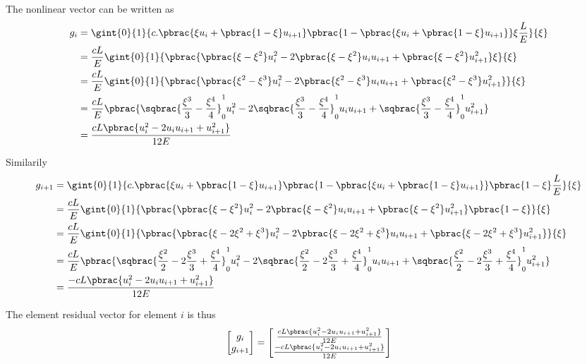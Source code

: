 The nonlinear vector can be written as
\begin{align}
  g_{i}&=\gint{0}{1}{c.\pbrac{\xi u_{i}+\pbrac{1-\xi}u_{i+1}}\pbrac{1-\pbrac{\xi u_{i}+\pbrac{1-\xi}u_{i+1}}}\xi\dfrac{L}{E}}{\xi} \\
  &=\dfrac{cL}{E}\gint{0}{1}{\pbrac{\pbrac{\xi-\xi^{2}}u^{2}_{i}-2\pbrac{\xi-\xi^{2}}u_{i}u_{i+1}+\pbrac{\xi-\xi^{2}}u^{2}_{i+1}}\xi}{\xi} \\
  &=\dfrac{cL}{E}\gint{0}{1}{\pbrac{\pbrac{\xi^{2}-\xi^{3}}u^{2}_{i}-2\pbrac{\xi^{2}-\xi^{3}}u_{i}u_{i+1}+\pbrac{\xi^{2}-\xi^{3}}u^{2}_{i+1}}}{\xi} \\
  &=\dfrac{cL}{E}\pbrac{\sqbrac{\dfrac{\xi^{3}}{3}-\dfrac{\xi^{4}}{4}}^{1}_{0}u^{2}_{i}-2\sqbrac{\dfrac{\xi^{3}}{3}-\dfrac{\xi^{4}}{4}}^{1}_{0}u_{i}u_{i+1}+\sqbrac{\dfrac{\xi^{3}}{3}-\dfrac{\xi^{4}}{4}}^{1}_{0}u^{2}_{i+1}}\\
  &=\dfrac{cL\pbrac{u_{i}^{2}-2u_{i}u_{i+1}+u_{i+1}^{2}}}{12E}
\end{align}

Similarily
\begin{align}
  g_{i+1}&=\gint{0}{1}{c.\pbrac{\xi u_{i}+\pbrac{1-\xi}u_{i+1}}\pbrac{1-\pbrac{\xi u_{i}+\pbrac{1-\xi}u_{i+1}}}\pbrac{1-\xi}\dfrac{L}{E}}{\xi} \\
  &=\dfrac{cL}{E}\gint{0}{1}{\pbrac{\pbrac{\xi-\xi^{2}}u^{2}_{i}-2\pbrac{\xi-\xi^{2}}u_{i}u_{i+1}+\pbrac{\xi-\xi^{2}}u^{2}_{i+1}}\pbrac{1-\xi}}{\xi} \\
  &=\dfrac{cL}{E}\gint{0}{1}{\pbrac{\pbrac{\xi-2\xi^{2}+\xi^{3}}u^{2}_{i}-2\pbrac{\xi-2\xi^{2}+\xi^{3}}u_{i}u_{i+1}+\pbrac{\xi-2\xi^{2}+\xi^{3}}u^{2}_{i+1}}}{\xi} \\
  &=\dfrac{cL}{E}\pbrac{\sqbrac{\dfrac{\xi^{2}}{2}-2\dfrac{\xi^{3}}{3}+\dfrac{\xi^{4}}{4}}^{1}_{0}u^{2}_{i}-2\sqbrac{\dfrac{\xi^{2}}{2}-2\dfrac{\xi^{3}}{3}+\dfrac{\xi^{4}}{4}}^{1}_{0}u_{i}u_{i+1}+\sqbrac{\dfrac{\xi^{2}}{2}-2\dfrac{\xi^{3}}{3}+\dfrac{\xi^{4}}{4}}^{1}_{0}u^{2}_{i+1}}\\
  &=\dfrac{-cL\pbrac{u_{i}^{2}-2u_{i}u_{i+1}+u_{i+1}^{2}}}{12E}
\end{align}


The element residual vector for element $i$ is thus
\begin{equation}
  \begin{bmatrix}
    g_{i}  \\
    g_{i+1} 
  \end{bmatrix} = \begin{bmatrix}
    \frac{cL\pbrac{u_{i}^{2}-2u_{i}u_{i+1}+u_{i+1}^{2}}}{12E} \\
    \frac{-cL\pbrac{u_{i}^{2}-2u_{i}u_{i+1}+u_{i+1}^{2}}}{12E}
   \end{bmatrix}
\end{equation}

